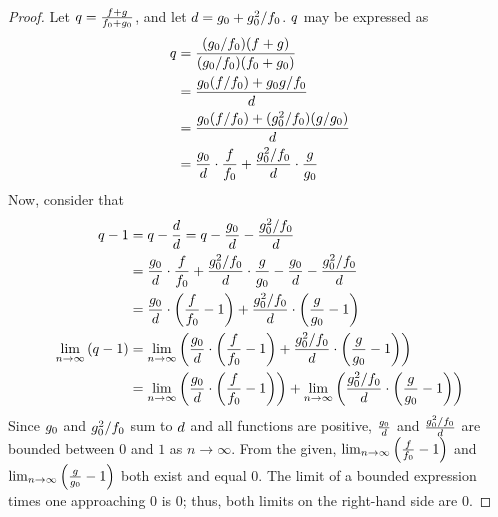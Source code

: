 \begin{proof}
	Let $q = \frac{f + g}{f_0 + g_0}$, and let $d = g_0 + g_0^2 / f_0$. $q$ may be expressed as
	\begin{align*}
	q &= \frac{(g_0 / f_0)(f + g)}{(g_0 / f_0)(f_0 + g_0)}\\
	&= \frac{g_0(f / f_0) + g_0g / f_0}{d}\\
	&= \frac{g_0(f / f_0) + (g_0^2 / f_0)(g / g_0)}{d}\\
	&= \frac{g_0}{d} \cdot \frac{f}{f_0} + \frac{g_0^2 / f_0}{d} \cdot \frac{g}{g_0}
	\end{align*}
	Now, consider that
	\begin{align*}
	q - 1 &= q - \frac{d}{d} = q - \frac{g_0}{d} - \frac{g_0^2 / f_0}{d}\\
	&= \frac{g_0}{d} \cdot \frac{f}{f_0} + \frac{g_0^2 / f_0}{d} \cdot \frac{g}{g_0} - \frac{g_0}{d} - \frac{g_0^2 / f_0}{d}\\
	&= \frac{g_0}{d} \cdot \left( \frac{f}{f_0} - 1 \right) + \frac{g_0^2 / f_0}{d} \cdot \left( \frac{g}{g_0} - 1 \right)\\
	\lim_{n \to \infty} \left( q - 1 \right) &= \lim_{n \to \infty} \left( \frac{g_0}{d} \cdot \left( \frac{f}{f_0} - 1 \right) + \frac{g_0^2 / f_0}{d} \cdot \left( \frac{g}{g_0} - 1 \right) \right)\\
	&= \lim_{n \to \infty} \left( \frac{g_0}{d} \cdot \left( \frac{f}{f_0} - 1 \right) \right) + \lim_{n \to \infty} \left( \frac{g_0^2 / f_0}{d} \cdot \left( \frac{g}{g_0} - 1 \right) \right)
	\end{align*}
	Since $g_0$ and $g_0^2 / f_0$ sum to $d$ and all functions are positive, $\frac{g_0}{d}$ and $\frac{g_0^2 / f_0}{d}$ are bounded between $0$ and $1$ as $n \to \infty$. From the given, $\lim_{n \to \infty} \left( \frac{f}{f_0} - 1 \right)$ and $\lim_{n \to \infty} \left( \frac{g}{g_0} - 1 \right)$ both exist and equal $0$. The limit of a bounded expression times one approaching $0$ is $0$; thus, both limits on the right-hand side are $0$.
	

\end{proof}
